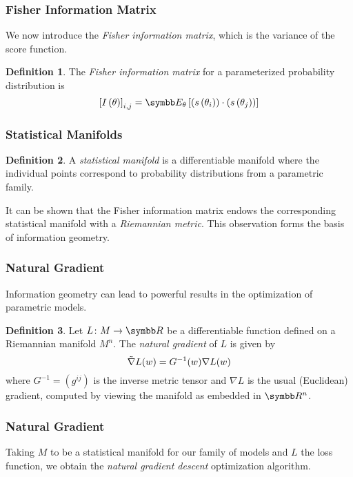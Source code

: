 \documentclass{beamer}
\theoremstyle{definition}
\newtheorem*{definition*}{Definition}
\begin{document}
\begin{frame}
\frametitle{Fisher Information Matrix}

We now introduce the \emph{Fisher information matrix}, which is the variance of the score function.

\begin{definition*}
The \emph{Fisher information matrix} for a parameterized probability distribution is
\[
    \left[I\left(\theta\right)\right]_{i, j} = \expectedvalue_{\theta} \left[\left(s\left(\theta_i\right)\right) \cdot \left(s\left(\theta_j\right)\right)\right]
\]
\end{definition*}
\end{frame}

\begin{frame}
\frametitle{Statistical Manifolds}

\begin{definition*}
A \emph{statistical manifold} is a differentiable manifold where the individual points correspond to probability distributions from a parametric family.
\end{definition*}

It can be shown that the Fisher information matrix endows the corresponding statistical manifold with a \emph{Riemannian metric}. This observation forms the basis of information geometry.
\end{frame}

\begin{frame}
\frametitle{Natural Gradient}

Information geometry can lead to powerful results in the optimization of parametric models.

\begin{definition*}
Let \(L \colon M \to \reals\) be a differentiable function defined on a Riemannian manifold \(M^n\). The \emph{natural gradient} of \(L\) is given by
\[
    \Tilde{\nabla} L (w) = G^{-1} (w) \nabla L (w)
\]
where \(G^{-1} = \left(g^{i j}\right)\) is the inverse metric tensor and \(\nabla L\) is the usual (Euclidean) gradient, computed by viewing the manifold as embedded in \(\reals^n\).
\end{definition*}
\end{frame}

\begin{frame}
\frametitle{Natural Gradient}

Taking \(M\) to be a statistical manifold for our family of models and \(L\) the loss function, we obtain the \emph{natural gradient descent} optimization algorithm.
\end{frame}
\end{document}
